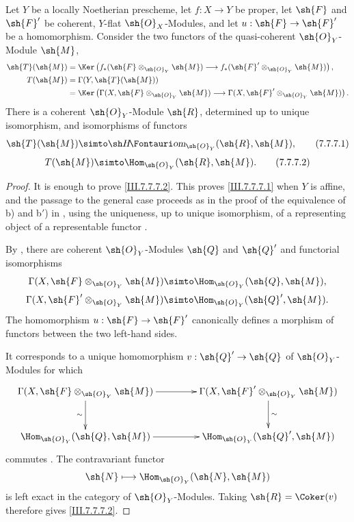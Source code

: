 \begin{corollary}[7.7.7]
\label{III.7.7.7}
Let $Y$ be a locally Noetherian prescheme, let
$f:X\to Y$ be proper, let $\sh{F}$ and $\sh{F}'$ be
coherent, $Y$-flat $\sh{O}_X$-Modules, and let
$u:\sh{F}\to\sh{F}'$ be a homomorphism.  Consider the two
functors of the quasi-coherent $\sh{O}_Y$-Module $\sh{M}$,
\begin{align*}
  \sh{T}(\sh{M})
  &=
  \Ker\left(
    f_*(\sh{F}\otimes_{\sh{O}_Y}\sh{M})
    \longrightarrow
    f_*(\sh{F}'\otimes_{\sh{O}_Y}\sh{M})
  \right),\\
  T(\sh{M})
  &=
  \Gamma(Y,\sh{T}(\sh{M}))\\
  &=
  \Ker\left(
    \Gamma(X,\sh{F}\otimes_{\sh{O}_Y}\sh{M})
    \longrightarrow
    \Gamma(X,\sh{F}'\otimes_{\sh{O}_Y}\sh{M})
  \right).
\end{align*}
There is a coherent $\sh{O}_Y$-Module $\sh{R}$, determined
up to unique isomorphism, and isomorphisms of functors
\[
  \sh{T}(\sh{M})
  \simto
  \shHom_{\sh{O}_Y}(\sh{R},\sh{M}),
  \tag{7.7.7.1}\label{III.7.7.7.1}
\]
\[
  T(\sh{M})
  \simto
  \Hom_{\sh{O}_Y}(\sh{R},\sh{M}).
  \tag{7.7.7.2}\label{III.7.7.7.2}
\]
\end{corollary}

\begin{proof}
It is enough to prove \eqref{III.7.7.7.2}.  This proves
\eqref{III.7.7.7.1} when $Y$ is affine, and the passage to
the general case proceeds as in the proof of the equivalence
of b) and b$'$) in , using the uniqueness,
up to unique isomorphism, of a representing object of a
representable functor .

By , there are coherent
$\sh{O}_Y$-Modules $\sh{Q}$ and $\sh{Q}'$ and functorial
isomorphisms
\[
  \Gamma(X,\sh{F}\otimes_{\sh{O}_Y}\sh{M})
  \simto
  \Hom_{\sh{O}_Y}(\sh{Q},\sh{M}),
\]
\[
  \Gamma(X,\sh{F}'\otimes_{\sh{O}_Y}\sh{M})
  \simto
  \Hom_{\sh{O}_Y}(\sh{Q}',\sh{M}).
\]
The homomorphism $u:\sh{F}\to\sh{F}'$ canonically defines a
morphism of functors between the two left-hand sides.

It corresponds to a unique homomorphism
$v:\sh{Q}'\to\sh{Q}$ of $\sh{O}_Y$-Modules for which
\[
\xymatrix@C=42pt@R=28pt{
  \Gamma(X,\sh{F}\otimes_{\sh{O}_Y}\sh{M})
    \ar[r]\ar[d]_-{\sim}
  &
  \Gamma(X,\sh{F}'\otimes_{\sh{O}_Y}\sh{M})
    \ar[d]^-{\sim}
  \\
  \Hom_{\sh{O}_Y}(\sh{Q},\sh{M})
    \ar[r]
  &
  \Hom_{\sh{O}_Y}(\sh{Q}',\sh{M})
}
\]
commutes .  The contravariant functor
\[
  \sh{N}\longmapsto
  \Hom_{\sh{O}_Y}(\sh{N},\sh{M})
\]
is left exact in the category of $\sh{O}_Y$-Modules.
Taking $\sh{R}=\Coker(v)$ therefore gives
\eqref{III.7.7.7.2}.
\end{proof}

